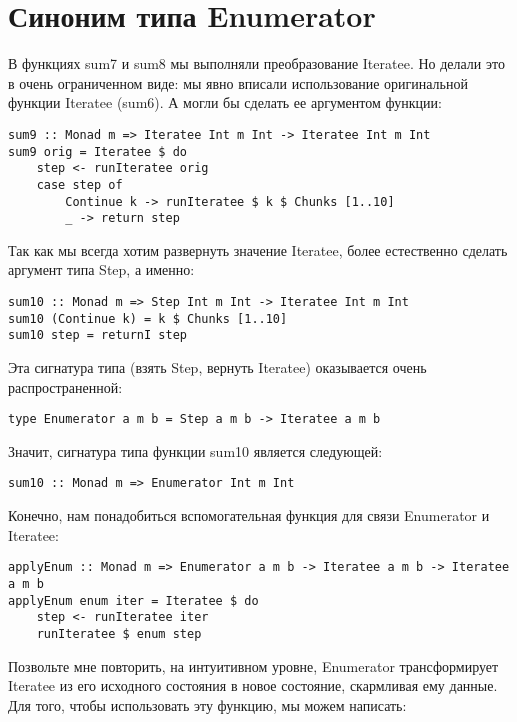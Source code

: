 \section{Синоним типа Enumerator}

В функциях sum7 и sum8 мы выполняли преобразование Iteratee. Но делали это в очень ограниченном виде: мы явно вписали использование оригинальной функции Iteratee (sum6). А могли бы сделать ее аргументом функции:

\begin{lstlisting}
sum9 :: Monad m => Iteratee Int m Int -> Iteratee Int m Int
sum9 orig = Iteratee $ do
    step <- runIteratee orig
    case step of
        Continue k -> runIteratee $ k $ Chunks [1..10]
        _ -> return step
\end{lstlisting}%

Так как мы всегда хотим развернуть значение Iteratee, более естественно сделать аргумент типа Step, а именно:

\begin{lstlisting}
sum10 :: Monad m => Step Int m Int -> Iteratee Int m Int
sum10 (Continue k) = k $ Chunks [1..10]
sum10 step = returnI step
\end{lstlisting}%

Эта сигнатура типа (взять Step, вернуть Iteratee) оказывается очень распространенной:

\begin{lstlisting}
type Enumerator a m b = Step a m b -> Iteratee a m b
\end{lstlisting}

Значит, сигнатура типа функции sum10 является следующей:

\begin{lstlisting}
sum10 :: Monad m => Enumerator Int m Int
\end{lstlisting}

Конечно, нам понадобиться вспомогательная функция для связи Enumerator и Iteratee:

\begin{lstlisting}
applyEnum :: Monad m => Enumerator a m b -> Iteratee a m b -> Iteratee a m b
applyEnum enum iter = Iteratee $ do
    step <- runIteratee iter
    runIteratee $ enum step
\end{lstlisting}%

Позвольте мне повторить, на интуитивном уровне, Enumerator трансформирует Iteratee из его исходного состояния в новое состояние, скармливая ему данные. Для того, чтобы использовать эту функцию, мы можем написать:

